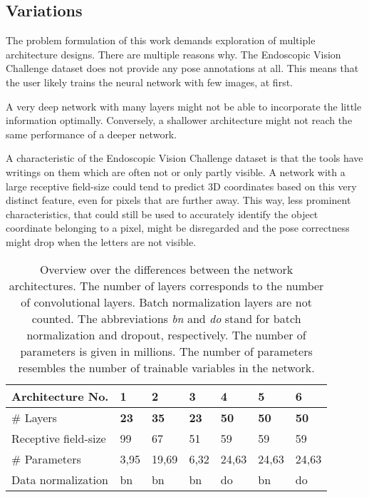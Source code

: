 \subsection{Variations} \label{section:network_variations}

The problem formulation of this work demands exploration of multiple architecture designs. There are multiple reasons why. The Endoscopic Vision Challenge dataset does not provide any pose annotations at all. This means that the user likely trains the neural network with few images, at first. 

A very deep network with many layers might not be able to incorporate the little information optimally. Conversely, a shallower architecture might not reach the same performance of a deeper network. 

A characteristic of the Endoscopic Vision Challenge dataset is that the tools have writings on them which are often not or only partly visible. A network with a large receptive field-size could tend to predict 3D coordinates based on this very distinct feature, even for pixels that are further away. This way, less prominent characteristics, that could still be used to accurately identify the object coordinate belonging to a pixel, might be disregarded and the pose correctness might drop when the letters are not visible.

\begin{table}[]
\centering
\begin{tabular}{|l||llllll|}
\hline Architecture No.        & 1          & 2          & 3          & 4          & 5          & 6        \\ \hline\hline
\rowcolor{Gray}
\# Layers               & \textbf{23}         & \textbf{35}         & \textbf{23}         & \textbf{50}         & \textbf{50}         & \textbf{50}       \\
Receptive field-size    & 99         & 67         & 51         & 59         & 59         & 59       \\
\rowcolor{Gray}
\# Parameters & 3,95  & 19,69 & 6,32  & 24,63 & 24,63   & 24,63 \\
Data normalization      & bn & bn & bn & do    & bn & do \\ \hline
\end{tabular}
\caption{Overview over the differences between the network architectures. The number of layers corresponds to the number of convolutional layers. Batch normalization layers are not counted. The abbreviations \textit{bn} and \textit{do} stand for batch normalization and dropout, respectively. The number of parameters is given in millions. The number of parameters resembles the number of trainable variables in the network.}
\label{table:network_architectures}
\end{table}

